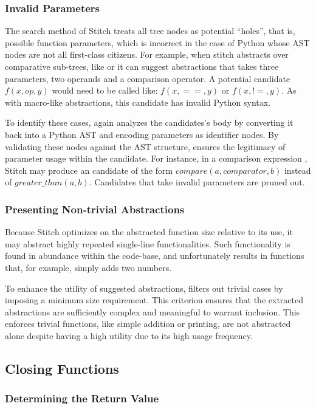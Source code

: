 \subsubsection{Invalid Parameters}
The search method of Stitch treats all tree nodes as potential ``holes'', that is, possible function parameters, which is incorrect in the case of Python whose AST nodes are not all first-class citizens. For example, when stitch abstracts over comparative sub-trees, like  or  it can suggest abstractions that takes three parameters, two operands and a comparison operator. A potential candidate $f(x,op,y)$ would need to be called like: $f(x, ==, y)$ or $f(x, !=, y)$. As with macro-like abstractions, this candidate has invalid Python syntax.

To identify these cases, \toolname again analyzes the candidates’s body by converting it back into a Python AST and encoding parameters as identifier nodes. By validating these nodes against the AST structure, \toolname ensures the legitimacy of parameter usage within the candidate. For instance, in a comparison expression , Stitch may produce an candidate of the form $compare(a, comparator, b)$ instead of $greater\_than(a,b)$.  Candidates that take invalid parameters are pruned out. 

\subsubsection{Presenting Non-trivial Abstractions}
Because Stitch optimizes on the abstracted function size relative to its use, it may abstract highly repeated single-line functionalities. Such functionality is found in abundance within the code-base, and unfortunately results in functions that, for example, simply adds two numbers.

To enhance the utility of suggested abstractions, \toolname filters out trivial cases by imposing a minimum size requirement. This criterion ensures that the extracted abstractions are sufficiently complex and meaningful to warrant inclusion. This enforces trivial functions, like simple addition or printing, are not abstracted alone despite having a high utility due to its high usage frequency. 

\label{closing}
\subsection{Closing Functions}

\subsubsection{Determining the Return Value}

